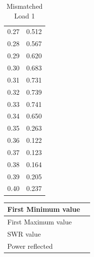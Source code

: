 \documentclass{report}
\begin{document}
\begin{multicols}{2}
\begin{table}[H]
\begin{tabular}{cc}
        0.27 & 0.512 \\
        0.28 & 0.567 \\
        0.29 & 0.620 \\
        0.30 & 0.683 \\
        0.31 & 0.731 \\
        0.32 & 0.739 \\
        0.33 & 0.741 \\
        0.34 & 0.650 \\
        0.35 & 0.263 \\
        0.36 & 0.122 \\
        0.37 & 0.123 \\
        0.38 & 0.164 \\
        0.39 & 0.205 \\
        0.40 & 0.237 \\
        \hline
        \end{tabular}
        \caption{Mismatched Load 1}
    \end{table}
    \begin{table}[H]
        \begin{tabular}{|l|l|}
            \hline
            First Minimum value & \\ \hline
            First Maximum value & \\ \hline
            SWR value & \\ \hline
            Power reflected & \\ \hline
            
        \end{tabular}
    \end{table}
    \end{multicols}
\end{document}
